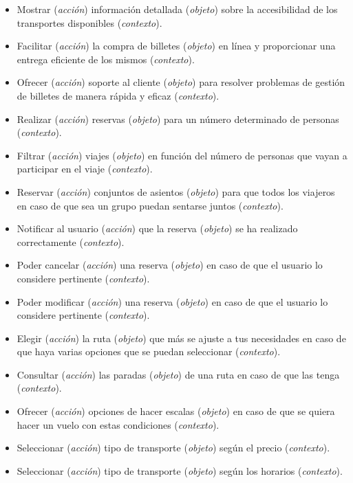 \begin{itemize}
    \item Mostrar (\textit{acción}) información detallada (\textit{objeto}) sobre la accesibilidad de los transportes disponibles (\textit{contexto}).
    \item Facilitar (\textit{acción}) la compra de billetes (\textit{objeto}) en línea y proporcionar una entrega eficiente de los mismos (\textit{contexto}).
    \item Ofrecer (\textit{acción}) soporte al cliente (\textit{objeto}) para resolver problemas de gestión de billetes de manera rápida y eficaz (\textit{contexto}).
    \item Realizar (\textit{acción}) reservas (\textit{objeto}) para un número determinado de personas (\textit{contexto}).
    \item Filtrar (\textit{acción}) viajes (\textit{objeto}) en función del número de personas que vayan a participar en el viaje (\textit{contexto}).
    \item Reservar (\textit{acción}) conjuntos de asientos (\textit{objeto}) para que todos los viajeros en caso de que sea un grupo puedan sentarse juntos (\textit{contexto}).
    \item Notificar al usuario (\textit{acción}) que la reserva (\textit{objeto}) se ha realizado correctamente (\textit{contexto}).
    \item Poder cancelar (\textit{acción}) una reserva (\textit{objeto}) en caso de que el usuario lo considere pertinente (\textit{contexto}).
    \item Poder modificar (\textit{acción}) una reserva (\textit{objeto}) en caso de que el usuario lo considere pertinente (\textit{contexto}).
    \item Elegir (\textit{acción}) la ruta (\textit{objeto}) que más se ajuste a tus necesidades en caso de que haya varias opciones que se puedan seleccionar (\textit{contexto}).
    \item Consultar (\textit{acción}) las paradas (\textit{objeto}) de una ruta en caso de que las tenga (\textit{contexto}).
    \item Ofrecer (\textit{acción}) opciones de hacer escalas (\textit{objeto}) en caso de que se quiera hacer un vuelo con estas condiciones (\textit{contexto}).
    \item Seleccionar (\textit{acción}) tipo de transporte (\textit{objeto}) según el precio (\textit{contexto}).
    \item Seleccionar (\textit{acción}) tipo de transporte (\textit{objeto}) según los horarios (\textit{contexto}).

\end{itemize}

